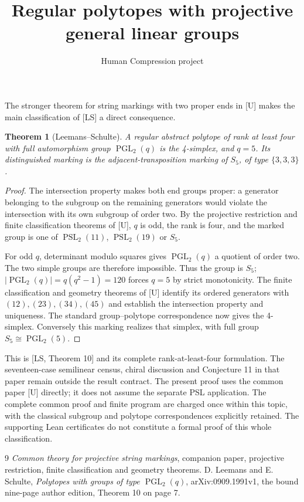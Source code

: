 \documentclass[11pt,a4paper]{article}
\title{Regular polytopes with projective general linear groups}
\author{Human Compression project}
\date{}
\newtheorem{theorem}{Theorem}
\begin{document}
\maketitle

The stronger theorem for string markings with two proper ends in [U]
makes the main classification of [LS] a direct consequence.

\begin{theorem}[Leemans--Schulte]
A regular abstract polytope of rank at least four with full
automorphism group $\operatorname{PGL}_2(q)$ is the 4-simplex, and
$q=5$. Its distinguished marking is the adjacent-transposition
marking of $S_5$, of type $\{3,3,3\}$.
\end{theorem}

\begin{proof}
The intersection property makes both end groups proper: a generator
belonging to the subgroup on the remaining generators would violate
the intersection with its own subgroup of order two. By the
projective restriction and finite classification theorems of [U],
$q$ is odd, the rank is four, and the marked group is one of
$\operatorname{PSL}_2(11)$, $\operatorname{PSL}_2(19)$ or $S_5$.

For odd $q$, determinant modulo squares gives
$\operatorname{PGL}_2(q)$ a quotient of order two. The two simple
groups are therefore impossible. Thus the group is $S_5$;
$|\operatorname{PGL}_2(q)|=q(q^2-1)=120$ forces $q=5$ by strict
monotonicity. The finite classification and geometry theorems of [U]
identify its ordered generators with $(12),(23),(34),(45)$ and
establish the intersection property and uniqueness. The standard
group--polytope correspondence now gives the 4-simplex. Conversely
this marking realizes that simplex, with full group
$S_5\cong\operatorname{PGL}_2(5)$.
\end{proof}

This is [LS, Theorem 10] and its complete rank-at-least-four
formulation. The seventeen-case semilinear census, chiral discussion
and Conjecture 11 in that paper remain outside the result contract.
The present proof uses the common paper [U] directly; it does not
assume the separate PSL application. The complete common proof and
finite program are charged once within this topic, with the
classical subgroup and polytope correspondences explicitly retained.
The supporting Lean certificates do not constitute a formal proof of
this whole classification.

\begin{thebibliography}{9}
 \emph{Common theory for projective string markings},
companion paper, projective restriction, finite classification and
geometry theorems.
 D. Leemans and E. Schulte,
\emph{Polytopes with groups of type $\operatorname{PGL}_2(q)$},
arXiv:0909.1991v1, the bound nine-page author edition,
Theorem 10 on page 7.
\end{thebibliography}
\end{document}
